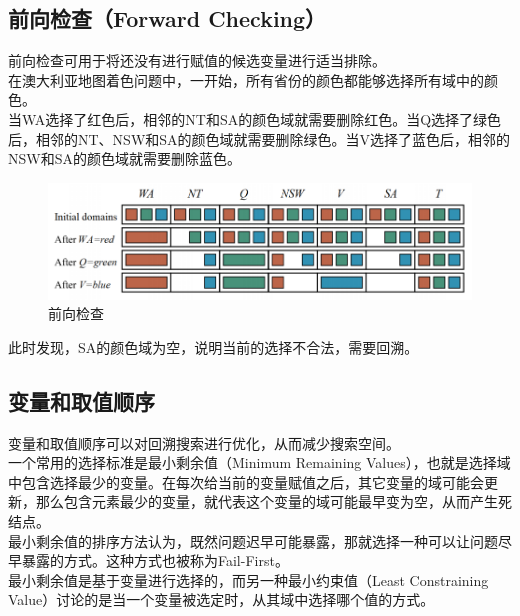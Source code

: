\vspace{0.5cm}

\subsection{前向检查（Forward Checking）}

前向检查可用于将还没有进行赋值的候选变量进行适当排除。\\

在澳大利亚地图着色问题中，一开始，所有省份的颜色都能够选择所有域中的颜色。\\

当WA选择了红色后，相邻的NT和SA的颜色域就需要删除红色。当Q选择了绿色后，相邻的NT、NSW和SA的颜色域就需要删除绿色。当V选择了蓝色后，相邻的NSW和SA的颜色域就需要删除蓝色。

\begin{figure}[H]
    \centering
    \includegraphics[scale=0.75]{img/C2/2-3/2.png}
    \caption{前向检查}
\end{figure}

此时发现，SA的颜色域为空，说明当前的选择不合法，需要回溯。\\

\subsection{变量和取值顺序}

变量和取值顺序可以对回溯搜索进行优化，从而减少搜索空间。\\

一个常用的选择标准是最小剩余值（Minimum Remaining Values），也就是选择域中包含选择最少的变量。在每次给当前的变量赋值之后，其它变量的域可能会更新，那么包含元素最少的变量，就代表这个变量的域可能最早变为空，从而产生死结点。\\

最小剩余值的排序方法认为，既然问题迟早可能暴露，那就选择一种可以让问题尽早暴露的方式。这种方式也被称为Fail-First。\\

最小剩余值是基于变量进行选择的，而另一种最小约束值（Least Constraining Value）讨论的是当一个变量被选定时，从其域中选择哪个值的方式。\\

